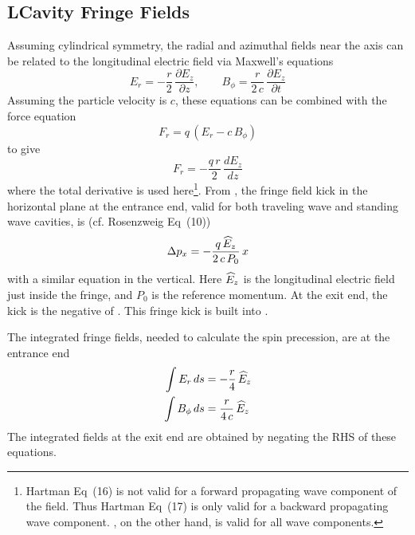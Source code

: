 \subsection{LCavity Fringe Fields}

Assuming cylindrical symmetry, the radial and azimuthal fields near the axis 
can be related to the longitudinal electric field via Maxwell's equations\cite{b:hartman}
\begin{equation}
  E_r = -\frac{r}{2} \, \frac{\partial E_z}{\partial z}, \qquad
  B_\phi = \frac{r}{2 \, c} \, \frac{\partial E_z}{\partial t}
\end{equation}
Assuming the particle velocity is $c$, these equations can be combined with the force equation
\begin{equation}
  F_r = q \, \left( E_r - c \, B_\phi \right)
\end{equation}
to give\cite{b:rosenzweig}
\begin{equation}
  F_r = - \frac{q \, r}{2} \, \frac{d E_z}{dz}
  \label{fqr2}
\end{equation}
where the total derivative is used here\footnote
  {
Hartman\cite{b:hartman} Eq~(16) is not valid for a forward propagating wave component of
the field. Thus Hartman Eq~(17) is only valid for a backward propagating wave component. ,
on the other hand, is valid for all wave components.
  }.
From , the fringe field kick in the horizontal plane at the entrance end, valid for both
traveling wave and standing wave cavities, is (cf. Rosenzweig\cite{b:rosenzweig} Eq~(10))
\begin{equation}
  \Delta p_x = - \frac{q \, \widehat E_z}{2 \, c \, P_0} \, x
  \label{pqe2c}
\end{equation}
with a similar equation in the vertical. Here $\widehat E_z$ is the longitudinal electric field just inside
the fringe, and $P_0$ is the reference momentum. At the exit end, the kick is the negative of
. This fringe kick is built into .

The integrated fringe fields, needed to calculate the spin precession, are at the entrance end
\begin{align}
  \int E_r \, ds &= -\frac{r}{4} \, \widehat E_z \nonumber \\
  \int B_\phi \, ds &= \frac{r}{4 \, c} \, \widehat E_z
\end{align}
The integrated fields at the exit end are obtained by negating the RHS of these equations.

